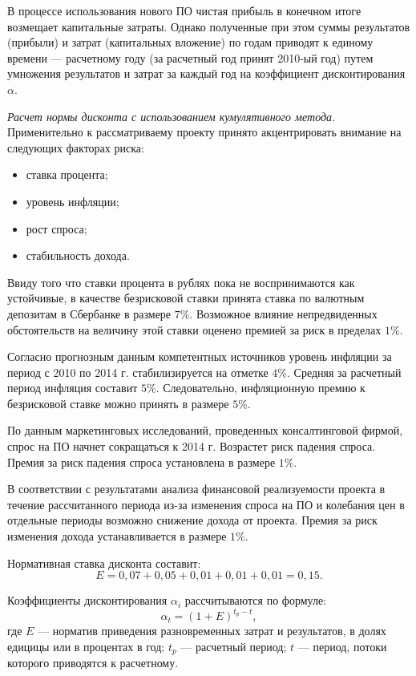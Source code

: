 В процессе использования нового ПО чистая прибыль в конечном итоге возмещает капитальные затраты. Однако полученные при этом суммы результатов (прибыли) и затрат (капитальных вложение) по годам приводят к единому времени --- расчетному году (за расчетный год принят 2010-ый год) путем умножения результатов и затрат за каждый год на коэффициент дисконтирования $\alpha$.

\emph{Расчет нормы дисконта с использованием кумулятивного метода.} Применительно к рассматриваему проекту принято акцентрировать внимание на следующих факторах риска:
\begin{itemize}
  \item ставка процента;
  \item уровень инфляции;
  \item рост спроса;
  \item стабильность дохода.
\end{itemize}

Ввиду того что ставки процента в рублях пока не воспринимаются как устойчивые, в качестве безрисковой ставки принята ставка по валютным депозитам в Сбербанке в размере $7\%$. Возможное влияние непредвиденных обстоятельств на величину этой ставки оценено премией за риск в пределах $1\%$.

Согласно прогнозным данным компетентных источников уровень инфляции за период с 2010 по 2014 г. стабилизируется на отметке $4\%$. Средняя за расчетный период инфляция составит $5\%$. Следовательно, инфляционную премию к безрисковой ставке можно принять в размере $5\%$.

По данным маркетинговых исследований, проведенных консалтинговой фирмой, спрос на ПО начнет сокращаться к 2014 г. Возрастет риск падения спроса. Премия за риск падения спроса установлена в размере $1\%$.

В соответствии с результатами анализа финансовой реализуемости проекта в течение рассчитанного периода из-за изменения спроса на ПО и колебания цен в отдельные периоды возможно снижение дохода от проекта. Премия за риск изменения дохода устанавливается в размере $1\%$.

Нормативная ставка дисконта составит:
\begin{displaymath}
  E = 0,07 + 0,05 + 0,01 + 0,01 + 0,01 = 0,15.
\end{displaymath}

Коэффициенты дисконтирования $\alpha_i$ рассчитываются по формуле:
\begin{displaymath}
  \alpha_t = (1 + E)^{t_p - t},
\end{displaymath}
где $E$ --- норматив приведения разновременных затрат и результатов, в долях едицицы или в процентах в год; $t_p$ --- расчетный период; $t$ --- период, потоки которого приводятся к расчетному.

